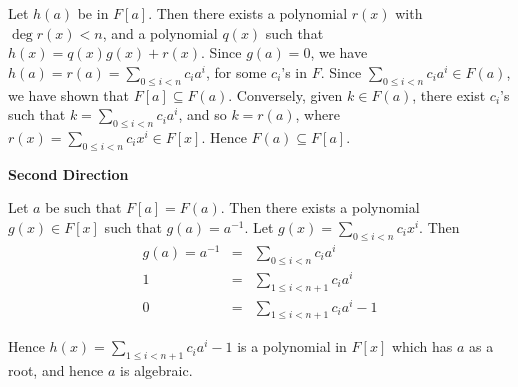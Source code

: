 \documentclass[11pt]{article} \usepackage{amssymb}
\begin{document}
\begin{enumerate}
    Let $h(a)$ be in $F[a]$. 
    Then there exists a polynomial
    $r(x)$ with $\deg r(x) < n$, and a polynomial $q(x)$ such that 
    $h(x)=q(x)g(x)+r(x)$. Since $g(a)=0$, we have 
    $h(a)=r(a)=\sum_{0\leq i <n}c_ia^i$, for some $c_i$'s in $F$. Since
    $\sum_{0\leq i <n}c_ia^i \in F(a)$, we have shown that $F[a] \subseteq F(a)$. 
    Conversely, given $k \in F(a)$, there exist $c_i$'s such that $k=\sum_{0\leq i <n}c_ia^i$,
    and so $k=r(a)$, where $r(x)=\sum_{0\leq i <n}c_ix^i \in F[x]$. 
    Hence $F(a) \subseteq F[a]$.

    {\bf Second Direction}

    Let $a$ be such that $F[a]=F(a)$. Then there exists a polynomial 
    $g(x) \in F[x]$ such that $g(a)=a^{-1}$. Let $g(x)=\sum_{0\leq i < n}c_ix^i$. Then
    \begin{eqnarray*}
      g(a)=a^{-1}&=&\sum_{0\leq i < n}c_ia^i
      \\ 1 &=& \sum_{1\leq i < n + 1}c_ia^i
      \\ 0 &=& \sum_{1\leq i < n + 1}c_ia^i - 1
    \end{eqnarray*}
    
    Hence $h(x)=\sum_{1\leq i < n + 1}c_ia^i - 1$ is a polynomial in $F[x]$ which
    has $a$ as a root, and hence $a$ is algebraic.

\end{enumerate}
\end{document}
